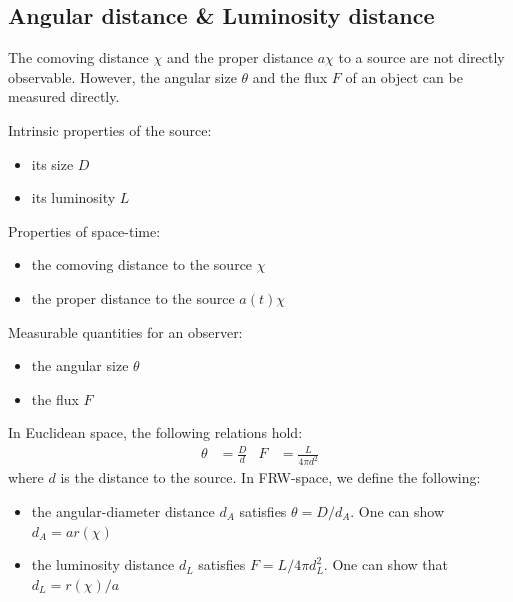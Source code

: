 \subsection{Angular distance \& Luminosity distance}

The comoving distance $\chi$ and the proper distance $a \chi$ to a source are not directly observable. However, the angular size $\theta$ and the flux $F$ of an object can be measured directly.

Intrinsic properties of the source:
\begin{itemize}
	\item its size $D$
	\item its luminosity $L$
\end{itemize}
Properties of space-time:
\begin{itemize}
	\item the comoving distance to the source $\chi$
	\item the proper distance to the source $a(t) \chi$
\end{itemize}
Measurable quantities for an observer:
\begin{itemize}
	\item the angular size $\theta$
	\item the flux $F$
\end{itemize}
In Euclidean space, the following relations hold:
\begin{align*}
	\theta &= \frac{D}{d}
	& F &= \frac{L}{4 \pi d^2}
\end{align*}
where $d$ is the distance to the source. In FRW-space, we define the following:
\begin{itemize}
	\item the angular-diameter distance $d_A$ satisfies $\theta = D/d_A$. One can show $d_A = a r(\chi)$
	\item the luminosity distance $d_L$ satisfies $F = L/4\pi d_L^2$. One can show that $d_L = r(\chi)/a$
\end{itemize}

